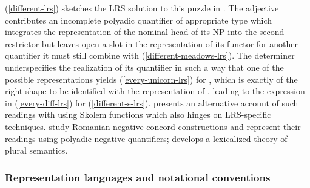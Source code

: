 \documentclass[output=paper]{langsci/langscibook}
\begin{document}
(\ref{different-lrs}) sketches the LRS solution to this puzzle in
\citet{Richter2016}. The
adjective  contributes an incomplete polyadic
quantifier of appropriate type which integrates the representation of
the nominal head of its NP into the second restrictor but leaves open
a slot in the representation of its functor for another quantifier it
must still combine with (\ref{different-meadows-lrs}). The determiner
 underspecifies the realization of its quantifier in such
a way that one of the possible representations yields
(\ref{every-unicorn-lrs}) for , which is exactly
of the right shape to be identified with the representation of
, leading to the expression in
(\ref{every-diff-lrs}) for (\ref{different-s-lrs}).
\citet{Lahm2016b} presents an alternative account of such readings
with  using Skolem functions which also hinges on
LRS-specific techniques. \citet{IordachioaiaandRichter2015} study Romanian
negative concord constructions and represent their readings using polyadic negative
quantifiers; \citet{Lahm2018} develops a lexicalized theory
of plural semantics.




\subsubsection{Representation languages and notational conventions}
\end{document}
